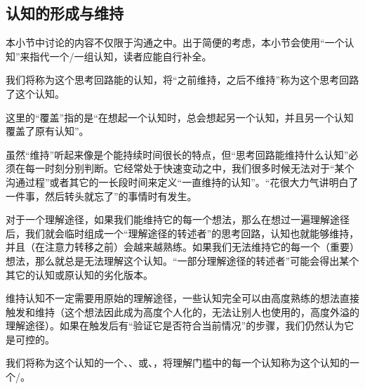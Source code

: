 \subsection{认知的形成与维持}
\begin{explain}
本小节中讨论的内容不仅限于沟通之中。出于简便的考虑，本小节会使用“一个认知”来指代一个/一组认知，读者应能自行补全。
\end{explain}
我们将称为这个思考回路能的认知，将“之前维持，之后不维持”称为这个思考回路了这个认知。
\begin{explain}
这里的“覆盖”指的是“在想起一个认知时，总会想起另一个认知，并且另一个认知覆盖了原有认知”。

虽然“维持”听起来像是个能持续时间很长的特点，但“思考回路能维持什么认知”必须在每一时刻分别判断。它经常处于快速变动之中，我们很多时候无法对于“某个沟通过程”或者其它的一长段时间来定义“一直维持的认知”。“花很大力气讲明白了一件事，然后转头就忘了”的事情时有发生。

对于一个理解途径，如果我们能维持它的每一个想法，那么在想过一遍理解途径后，我们就会临时组成一个“理解途径的转述者”的思考回路，认知也就能够维持，并且（在注意力转移之前）会越来越熟练。如果我们无法维持它的每一个（重要）想法，那么就总是无法理解这个认知。“一部分理解途径的转述者”可能会得出某个其它的认知或原认知的劣化版本。

维持认知不一定需要用原始的理解途径，一些认知完全可以由高度熟练的想法直接触发和维持（这个想法因此成为高度个人化的，无法让别人也使用的，高度外溢的理解途径）。如果在触发后有“验证它是否符合当前情况”的步骤，我们仍然认为它是可控的。
\end{explain}
我们将称为这个认知的一个、、或、，将理解门槛中的每一个认知称为这个认知的一个/。
